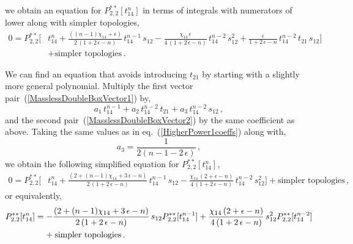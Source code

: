 \documentclass[aps,prd,preprint,groupedaddress,nofootinbib,showpacs,eqsecnum]{revtex4}
\def\eqn#1{eq.~(\ref{#1})}
\def\eps{\epsilon}
\def\Pss#1#2{P^{**}_{#1,#2}}
\begin{document}
we obtain an equation for $\Pss22[t_{14}^{n}]$ in terms of
integrals with numerators of lower \ideg{} along with simpler topologies,
\begin{equation}
\begin{aligned}
0 =\Pss22\bigl[&
t_{14}^{n}
+\tfrac{((n-1)\chi_{14}+\eps)}{2\,(1+2\,\eps-n)}\,t_{14}^{n-1}\,s_{12}
-\tfrac{\chi_{14}\,\eps}{4\,(1+2\,\eps-n)}\,t_{14}^{n-2}\,s_{12}^{2}
+\tfrac{\eps}{1+2\,\eps-n}\,t_{14}^{n-2}\,t_{21}\,s_{12}
\bigr]
\\ &
+\textrm{simpler\ topologies}\,.
\end{aligned}
\label{HigherPower2}
\end{equation}

We can find an equation that avoids introducing $t_{21}$ by
starting with a slightly more general polynomial.
Multiply
the first vector pair~(\ref{MasslessDoubleBoxVector1}) by,
\begin{equation}
a_1 \,t_{14}^{n-1}
+ a_2 \,t_{14}^{n-2}\,t_{21}
+ a_3 \,t_{14}^{n-2}\,s_{12}\,,
\label{HigherPower2Poly1}
\end{equation}
and the second pair~(\ref{MasslessDoubleBoxVector2}) by 
the same coefficient as above.
Taking the same values as in \eqn{HigherPower1coeffs} along with,
\begin{equation}
a_3 = 
  \frac{1}{2(n-1-2\,\eps)}
  \,,
\end{equation}
we obtain the following simplified equation for $\Pss22[t_{14}^{n}]$,
\begin{equation}
\begin{aligned}
0 =\Pss22\bigl[&
t_{14}^{n}
+\tfrac{(2+(n-1)\chi_{14}+3\,\eps-n)}{2\,(1+2\,\eps-n)}
\,t_{14}^{n-1}\,s_{12}
-\tfrac{\chi_{14}\,(2+\eps-n)}{4\,(1+2\,\eps-n)}
\,t_{14}^{n-2}\,s_{12}^{2}
\bigr]
+\textrm{simpler\ topologies}\,,
\end{aligned}
\label{HigherPower3o}
\end{equation}
or equivalently,
\begin{equation}
\begin{aligned}
\Pss22[t_{14}^n] &=
-\frac{(2+(n-1)\chi_{14}+3\,\eps-n)}{2\,(1+2\,\eps-n)}
\,s_{12}\Pss22[t_{14}^{n-1}]
+\frac{\chi_{14}\,(2+\eps-n)}{4\,(1+2\,\eps-n)}
\,s_{12}^{2}\Pss22[t_{14}^{n-2}]
\\&\hphantom{=\,\,}
+\textrm{simpler\ topologies}\,.
\end{aligned}
\label{HigherPower3}
\end{equation}
\end{document}
